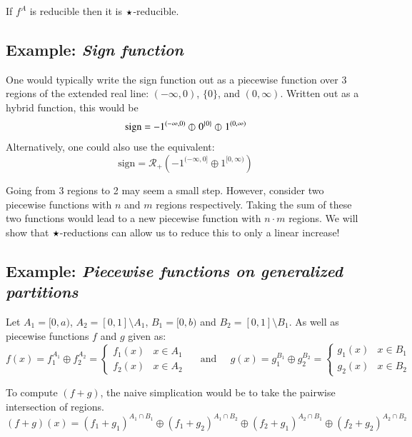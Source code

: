 If $f^A$ is reducible then it is $\star$-reducible.

\subsection{Example: \emph{Sign function}}

One would typically write the sign function out as a piecewise function over 3 regions of the extended real line: 
$(-\infty, 0)$, $\{ 0 \}$, and $(0, \infty)$.
Written out as a hybrid function, this would be
\begin{equation}
	\text{sign} = -1^{(-\infty, 0)} \varobar^{} 0^{\{0\}} \varobar^{} 1^{(0, \infty)}
\end{equation}
Alternatively, one could also use the equivalent:
\begin{equation}
	\text{sign} = \mathcal{R}_+ \left( -1^{(-\infty, 0]} \oplus 1^{[0, \infty)} \right)
\end{equation}

Going from 3 regions to 2 may seem a small step.
However, consider two piecewise functions with $n$ and $m$ regions respectively.
Taking the sum of these two functions would lead to a new piecewise function with $n\cdot m$ regions.
We will show that $\star$-reductions can allow us to reduce this to only a linear increase!

\subsection{Example: \emph{Piecewise functions on generalized partitions}} 
Let $A_1 = [0,a)$, $A_2 = [0,1] \setminus A_1$, $B_1 = [0,b)$ and $B_2 = [0,1] \setminus B_1$.
As well as piecewise functions $f$ and $g$ given as:
\begin{equation*}
	f(x) = f_1^{A_1} \oplus f_2^{A_2}
		= \begin{cases}
			f_1(x) & x \in A_1 \\
			f_2(x) & x \in A_2
		\end{cases}
	\;\;\;\;\; \text{and} \;\;\;\;\;
	g(x) = g_1^{B_1} \oplus g_2^{B_2}
		= \begin{cases}
			g_1(x) & x \in B_1 \\
			g_2(x) & x \in B_2
		\end{cases}
\end{equation*}

To compute $(f+g)$, the naive simplication would be to take the pairwise intersection of regions.
\begin{equation}
	(f+g)(x) = (f_1 + g_1)^{A_1 \cap B_1} 
		\oplus (f_1 + g_2)^{A_1 \cap B_2} 
		\oplus (f_2 + g_1)^{A_2 \cap B_1}
		\oplus (f_2 + g_2)^{A_2 \cap B_2}
\end{equation}

